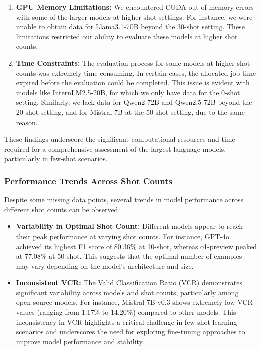 \documentclass[conference]{IEEEtran}
\begin{document}
\begin{enumerate}
    \item \textbf{GPU Memory Limitations:} We encountered CUDA out-of-memory errors with some of the larger models at higher shot settings. For instance, we were unable to obtain data for Llama3.1-70B beyond the 30-shot setting. These limitations restricted our ability to evaluate these models at higher shot counts.

    \item \textbf{Time Constraints:} The evaluation process for some models at higher shot counts was extremely time-consuming. In certain cases, the allocated job time expired before the evaluation could be completed. This issue is evident with models like InternLM2.5-20B, for which we only have data for the 0-shot setting. Similarly, we lack data for Qwen2-72B and Qwen2.5-72B beyond the 20-shot setting, and for Mistral-7B at the 50-shot setting, due to the same reason.
\end{enumerate}

These findings underscore the significant computational resources and time required for a comprehensive assessment of the largest language models, particularly in few-shot scenarios.

\subsubsection{Performance Trends Across Shot Counts}
Despite some missing data points, several trends in model performance across different shot counts can be observed:

\begin{itemize}
    \item \textbf{Variability in Optimal Shot Count:} Different models appear to reach their peak performance at varying shot counts. For instance, GPT-4o achieved its highest F1 score of 80.36\% at 10-shot, whereas o1-preview peaked at 77.08\% at 50-shot. This suggests that the optimal number of examples may vary depending on the model's architecture and size.
    
    \item \textbf{Inconsistent VCR:} The Valid Classification Ratio (VCR) demonstrates significant variability across models and shot counts, particularly among open-source models. For instance, Mistral-7B-v0.3 shows extremely low VCR values (ranging from 1.17\% to 14.20\%) compared to other models. This inconsistency in VCR highlights a critical challenge in few-shot learning scenarios and underscores the need for exploring fine-tuning approaches to improve model performance and stability.
\end{itemize}
\end{document}
